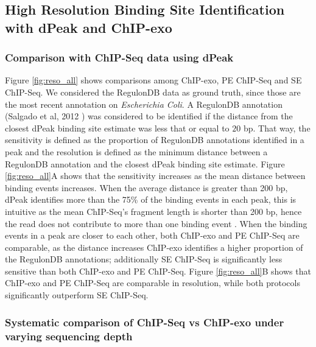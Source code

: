 \documentclass{bmcart}\usepackage[]{graphicx}\usepackage[]{color}
\begin{document}
\subsection{High Resolution Binding Site Identification with dPeak and
  ChIP-exo}

\subsubsection{Comparison with ChIP-Seq data using dPeak}



Figure \ref{fig:reso_all} shows comparisons among ChIP-exo, PE
ChIP-Seq and SE ChIP-Seq. We considered the RegulonDB data as ground
truth, since those are the most recent annotation on \emph{Escherichia
  Coli}. A RegulonDB annotation (Salgado et al, 2012 \cite{regulondb})
was considered to be identified if the distance from the closest dPeak
binding site estimate was less that or equal to $20$
bp. That way, the sensitivity is defined as the proportion of
RegulonDB annotations identified in a peak and the resolution is
defined as the minimum distance between a RegulonDB annotation and the
closest dPeak binding site estimate. Figure \ref{fig:reso_all}A shows
that the sensitivity increases as the mean distance between binding
events increases. When the average distance is greater than 200 bp,
dPeak identifies more than the 75\% of the binding events in each
peak, this is intuitive as the mean ChIP-Seq's fragment length is
shorter than 200 bp, hence the read does not contribute to more than
one binding event \cite{dpeak}. When the binding events in a peak are
closer to each other, both ChIP-exo and PE ChIP-Seq are comparable, as
the distance increases ChIP-exo identifies a higher proportion of the
RegulonDB annotations; additionally SE ChIP-Seq is significantly less
sensitive than both ChIP-exo and PE ChIP-Seq. Figure
\ref{fig:reso_all}B shows that ChIP-exo and PE ChIP-Seq are comparable
in resolution, while both protocols significantly outperform SE
ChIP-Seq.

\subsubsection{Systematic comparison of ChIP-Seq vs ChIP-exo under
  varying sequencing depth}
\end{document}

